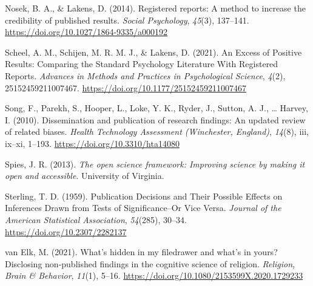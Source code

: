 \documentclass[
  ,jou, a4paper,floatsintext]{apa6}
\newlength{\cslhangindent}
\newlength{\cslentryspacingunit} %
\newenvironment{CSLReferences}[2] %
 {%
  \setlength{\parindent}{0pt}
  \ifodd #1
  \let\oldpar\par
  \def\par{\hangindent=\cslhangindent\oldpar}
  \fi
  \setlength{\parskip}{#2\cslentryspacingunit}
 }%
 {}
\begin{document}
\begin{CSLReferences}{1}{0}
\leavevmode{}%
Nosek, B. A., \& Lakens, D. (2014). Registered reports: {A} method to increase the credibility of published results. \emph{Social Psychology}, \emph{45}(3), 137--141. \url{https://doi.org/10.1027/1864-9335/a000192}

\leavevmode{}%
Scheel, A. M., Schijen, M. R. M. J., \& Lakens, D. (2021). An {Excess} of {Positive Results}: {Comparing} the {Standard Psychology Literature With Registered Reports}. \emph{Advances in Methods and Practices in Psychological Science}, \emph{4}(2), 25152459211007467. \url{https://doi.org/10.1177/25152459211007467}

\leavevmode{}%
Song, F., Parekh, S., Hooper, L., Loke, Y. K., Ryder, J., Sutton, A. J., \ldots{} Harvey, I. (2010). Dissemination and publication of research findings: An updated review of related biases. \emph{Health Technology Assessment (Winchester, England)}, \emph{14}(8), iii, ix--xi, 1--193. \url{https://doi.org/10.3310/hta14080}

\leavevmode{}%
Spies, J. R. (2013). \emph{The open science framework: {Improving} science by making it open and accessible}. {University of Virginia}.

\leavevmode{}%
Sterling, T. D. (1959). Publication {Decisions} and {Their Possible Effects} on {Inferences Drawn} from {Tests} of {Significance--Or Vice Versa}. \emph{Journal of the American Statistical Association}, \emph{54}(285), 30--34. \url{https://doi.org/10.2307/2282137}

\leavevmode{}%
van Elk, M. (2021). What's hidden in my filedrawer and what's in yours? {Disclosing} non-published findings in the cognitive science of religion. \emph{Religion, Brain \& Behavior}, \emph{11}(1), 5--16. \url{https://doi.org/10.1080/2153599X.2020.1729233}

\end{CSLReferences}

\endgroup
\end{document}
